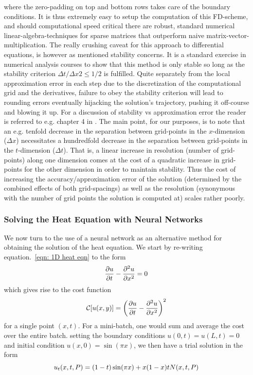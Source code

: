 \documentclass[reprint, english, nofootinbib]{revtex4-2}
\begin{document}
where the zero-padding on top and bottom rows takes care of the boundary conditions. It is thus extremely easy to setup the computation of this FD-scheme, and should computational speed critical there are robust, standard numerical linear-algebra-techniques for sparse matrices that outperform naive matrix-vector-multiplication. The really crushing caveat for this approach to differential equations, is however as mentioned stability concerns. It is a standard exercise in numerical analysis courses to show that this method is only stable so long as the stability criterion $\Delta t/\Delta x2 \leq 1/2$ is fulfilled. Quite separately from the local approximation error in each step due to the discretization of the computational grid and the derivatives, failure to obey the stability criterion will lead to rounding errors eventually hijacking the solution's trajectory, pushing it off-course and blowing it up. For a discussion of stability vs approximation error the reader is referred to e.g. chapter 4 in \cite{Iserles}. The main point, for our purposes, is to note that an e.g. tenfold decrease in the separation between grid-points in the $x$-dimension ($\Delta x$) necessitates a hundredfold decrease in the separation between grid-points in the $t$-dimension ($\Delta t$). That is, a linear increase in resolution (number of grid-points) along one dimension comes at the cost of a quadratic increase in grid-points for the other dimension in order to maintain stability. Thus the cost of increasing the accuracy/approximation error of the solution (determined by the combined effects of both grid-spacings) as well as the resolution (synonymous with the number of grid points the solution is computed at) scales rather poorly.

\subsubsection{Solving the Heat Equation with Neural Networks}
\noindent
We now turn to the use of a neural network as an alternative method for obtaining the solution of the heat equation. We start by re-writing equation.~\ref{eqn: 1D heat eqn} to the form
\begin{equation}
    \pdv{u}{t} - \pdv[2]{u}{x} = 0
\end{equation}
which gives rise to the cost function 
\begin{equation}
    \mathcal C\qty[u\qty(x, y)] = \qty(\pdv{u}{t} - \pdv[2]{u}{x})^2
\end{equation}
for a single point $(x,t)$. For a mini-batch, one would sum and average the cost over the entire batch.
setting the boundary conditions $u(0, t) = u(L, t) = 0$ and initial condition $u(x, 0) = \sin(\pi x)$, we then have a trial solution in the form
\begin{equation}
    u_t(x, t, P) = \qty(1 - t)\sin(\pi x) + x(1 - x)t N(x, t, P)
\end{equation}
\end{document}
